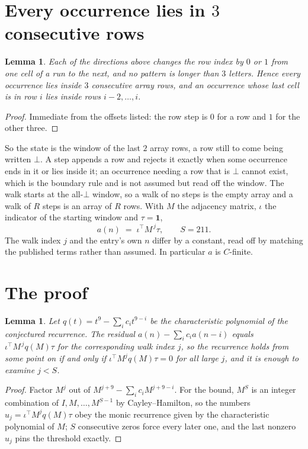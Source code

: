 \documentclass[11pt,a4paper]{article}
\theoremstyle{plain}
\newtheorem{lemma}[theorem]{Lemma}
\theoremstyle{definition}
\begin{document}
\section{Every occurrence lies in $3$ consecutive rows}

\begin{lemma}\label{lem:win}
Each of the directions above changes the row index by $0$ or $1$ from one cell of a run to the
next, and no pattern is longer than $3$ letters. Hence every occurrence lies inside $3$
consecutive array rows, and an occurrence whose last cell is in row $i$ lies inside rows
$i-2,\dots,i$.
\end{lemma}

\begin{proof}
Immediate from the offsets listed: the row step is $0$ for a row and $1$ for the other three.
\end{proof}

So the state is the window of the last $2$ array rows, a row still to come being written
$\bot$. A step appends a row and rejects it exactly when some occurrence ends in it or lies
inside it; an occurrence needing a row that is $\bot$ cannot exist, which is the boundary rule
and is not assumed but read off the window. The walk starts at the all-$\bot$ window, so a walk
of no steps is the empty array and a walk of $R$ steps is an array of $R$ rows. With $M$ the
adjacency matrix, $\iota$ the indicator of the starting window and $\tau=\mathbf{1}$,
\[
a(n)\;=\;\iota^{\!\top}M^{\,j}\tau ,\qquad S=211.
\]
The walk index $j$ and the entry's own $n$ differ by a constant, read off by matching the
published terms rather than assumed. In particular $a$ is $C$-finite.

\section{The proof}

\begin{lemma}\label{lem:crit}
Let $q(t)=t^{9}-\sum_i c_it^{9-i}$ be the characteristic polynomial of the
conjectured recurrence. The residual $a(n)-\sum_ic_ia(n-i)$ equals
$\iota^{\!\top}M^{\,j}q(M)\tau$ for the corresponding walk index $j$, so the recurrence
holds from some point on if and only if $\iota^{\!\top}M^{j}q(M)\tau=0$ for all large $j$,
and it is enough to examine $j<S$.
\end{lemma}

\begin{proof}
Factor $M^{j}$ out of $M^{j+9}-\sum_ic_iM^{j+9-i}$. For the bound, $M^{S}$
is an integer combination of $I,M,\dots,M^{S-1}$ by Cayley--Hamilton, so the numbers
$u_j=\iota^{\!\top}M^{j}q(M)\tau$ obey the monic recurrence given by the characteristic
polynomial of $M$; $S$ consecutive zeros force every later one, and the last nonzero $u_j$
pins the threshold exactly.
\end{proof}
\end{document}
